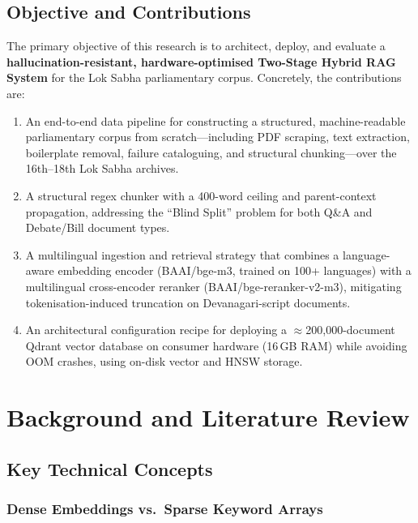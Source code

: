 \documentclass[conference]{IEEEtran}
\begin{document}
\subsection{Objective and Contributions}

The primary objective of this research is to architect, deploy, and evaluate
a \textbf{hallucination-resistant, hardware-optimised Two-Stage Hybrid RAG
System} for the Lok Sabha parliamentary corpus.
Concretely, the contributions are:

\begin{enumerate}[leftmargin=*, label=(\roman*)]
  \item An end-to-end data pipeline for constructing a structured,
    machine-readable parliamentary corpus from scratch---including PDF
    scraping, text extraction, boilerplate removal, failure cataloguing,
    and structural chunking---over the 16th--18th Lok Sabha archives.
  \item A structural regex chunker with a 400-word ceiling and
    parent-context propagation, addressing the ``Blind Split'' problem for
    both Q\&A and Debate/Bill document types.
  \item A multilingual ingestion and retrieval strategy that combines a
    language-aware embedding encoder (BAAI/bge-m3, trained on 100+ languages)
    with a multilingual cross-encoder reranker (BAAI/bge-reranker-v2-m3),
    mitigating tokenisation-induced truncation on Devanagari-script documents.
  \item An architectural configuration recipe for deploying a
    $\approx$200,000-document Qdrant vector database on consumer hardware
    (16\,GB RAM) while avoiding OOM crashes, using on-disk vector and HNSW
    storage.
\end{enumerate}

\section{Background and Literature Review}
\label{sec:background}

\subsection{Key Technical Concepts}

\subsubsection{Dense Embeddings vs.\ Sparse Keyword Arrays}
\end{document}
